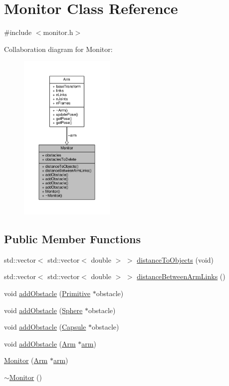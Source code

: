 \hypertarget{class_monitor}{}\section{Monitor Class Reference}
\label{class_monitor}


{\ttfamily \#include $<$monitor.\+h$>$}



Collaboration diagram for Monitor\+:\nopagebreak
\begin{figure}[H]
\begin{center}
\leavevmode
\includegraphics[width=129pt]{class_monitor__coll__graph}
\end{center}
\end{figure}
\subsection*{Public Member Functions}
\begin{DoxyCompactItemize}
\item 
std\+::vector$<$ std\+::vector$<$ double $>$ $>$ \hyperlink{class_monitor_afefe8eeab13fd3f8f3c59ae53d25a00e}{distance\+To\+Objects} (void)
\item 
std\+::vector$<$ std\+::vector$<$ double $>$ $>$ \hyperlink{class_monitor_afe72152adc0d2d2faf8fb01563417033}{distance\+Between\+Arm\+Links} ()
\item 
void \hyperlink{class_monitor_a8c448bcff703af93489cc4f0847d4245}{add\+Obstacle} (\hyperlink{class_primitive}{Primitive} $\ast$obstacle)
\item 
void \hyperlink{class_monitor_af5979d8f05c2d945ddc055e329fad5d2}{add\+Obstacle} (\hyperlink{class_sphere}{Sphere} $\ast$obstacle)
\item 
void \hyperlink{class_monitor_a192497730489ebcd6a6580875cfbeee3}{add\+Obstacle} (\hyperlink{class_capsule}{Capsule} $\ast$obstacle)
\item 
void \hyperlink{class_monitor_a580dedf3090ffff7a452dbe32cc585f4}{add\+Obstacle} (\hyperlink{class_arm}{Arm} $\ast$\hyperlink{class_monitor_a8b75571f6224f999a3dc05cf9a83fa68}{arm})
\item 
\hyperlink{class_monitor_adda7d547e1226e159836356dd8af14bb}{Monitor} (\hyperlink{class_arm}{Arm} $\ast$\hyperlink{class_monitor_a8b75571f6224f999a3dc05cf9a83fa68}{arm})
\item 
\hyperlink{class_monitor_a64aba8195effc068092ddea5a71e8176}{$\sim$\+Monitor} ()
\end{DoxyCompactItemize}
